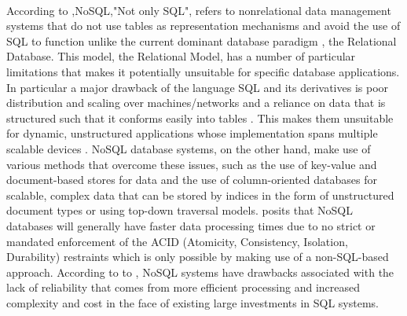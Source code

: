 \documentclass[12pt]{article}
\begin{document}
\paragraph{}
According to \cite{hossain13},NoSQL,"Not only SQL", refers to nonrelational data management systems that do not use tables as representation mechanisms and avoid the use of SQL to function unlike the current dominant database paradigm \citep{leavitt10}, the Relational Database. This model, the Relational Model, has a number of particular limitations that makes it potentially unsuitable for specific database applications. In particular a major drawback of the language SQL and its derivatives is poor distribution and scaling over machines/networks and a reliance on data that is structured such that it conforms easily into tables \citep{leavitt10}. This makes them unsuitable for dynamic, unstructured applications whose implementation spans multiple scalable devices \cite{mcCreary14}. NoSQL database systems, on the other hand, make use of various methods \citep{leavitt10} that overcome these issues, such as the use of key-value and document-based stores for data and the use of column-oriented databases for scalable, complex data that can be stored by indices in the form of unstructured document types or using top-down traversal models. \citep{leavitt10} posits that NoSQL databases will generally have faster data processing times due to no strict or mandated enforcement of the ACID (Atomicity, Consistency, Isolation, Durability) restraints which is only possible by making use of a non-SQL-based approach. According to to \citep{leavitt10}, NoSQL systems have drawbacks associated with the lack of reliability that comes from more efficient processing and increased complexity and cost in the face of existing large investments in SQL systems.
\end{document}
